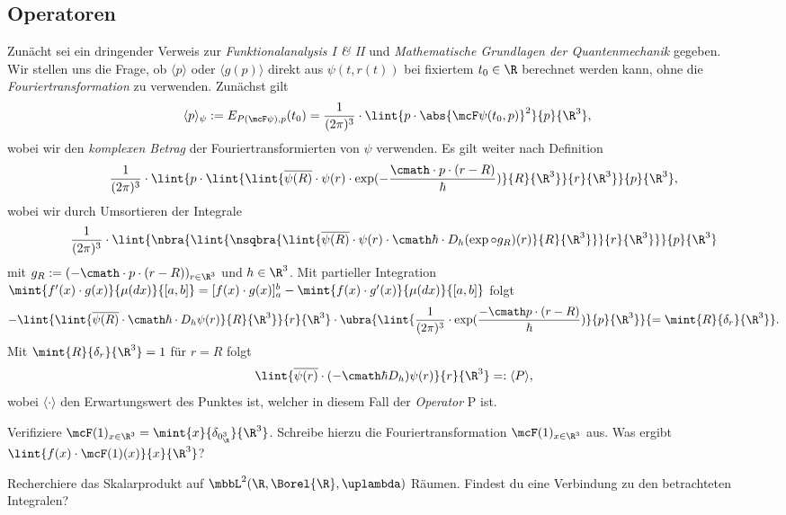 \documentclass{subfiles}
\begin{document}

    \subsection{Operatoren}
        Zunächt sei ein dringender Verweis zur \emph{Funktionalanalysis I & II} und \emph{Mathematische Grundlagen der Quantenmechanik} gegeben. \\

        Wir stellen uns die Frage, ob $\langle p\rangle$ oder $\langle g(p)\rangle$ direkt aus $\psi(t,r(t))$ bei fixiertem $t_0\in\R$ berechnet werden kann, ohne die \emph{Fouriertransformation} zu verwenden. Zunächst gilt 
        \begin{align*}
            \langle p\rangle_\psi:= E_{P(\mcF\psi),p}(t_0) &= \frac{1}{(2\pi)^3}\cdot\lint{p\cdot\abs{\mcF\psi(t_0,p)}^2}{p}{\R^3}, 
        \end{align*}
        wobei wir den \emph{komplexen Betrag} der Fouriertransformierten von $\psi$ verwenden. Es gilt weiter nach Definition
        \[\frac{1}{(2\pi)^3}\cdot\lint{p\cdot\lint{\lint{\overline{\psi(R)}\cdot\psi(r)\cdot\exp(-\frac{\cmath\cdot p\cdot (r-R)}{\hbar})}{R}{\R^3}}{r}{\R^3}}{p}{\R^3},\]
        wobei wir durch Umsortieren der Integrale 
        \[\frac{1}{(2\pi)^3}\cdot\lint{\nbra{\lint{\nsqbra{\lint{\overline{\psi(R)}\cdot\psi(r)\cdot \cmath\hbar\cdot D_h(\exp\circ g_R)(r)}{R}{\R^3}}}{r}{\R^3}}}{p}{\R^3}\]
        mit $g_R:=(-\cmath\cdot p\cdot(r-R))_{r\in\R^3}$ und $h\in\R^3$. Mit partieller Integration $\mint{f'(x)\cdot g(x)}{\mu(dx)}{[a,b]} = [f(x)\cdot g(x)]_a^b-\mint{f(x)\cdot g'(x)}{\mu(dx)}{[a,b]}$ folgt
        \[-\lint{\lint{\overline{\psi(R)}\cdot\cmath\hbar\cdot D_h\psi(r)}{R}{\R^3}}{r}{\R^3}\cdot\ubra{\lint{\frac{1}{(2\pi)^3}\cdot\exp(\frac{-\cmath p\cdot(r-R)}{\hbar})}{p}{\R^3}}{=\mint{R}{\delta_r}{\R^3}}.\]
        Mit $\mint{R}{\delta_r}{\R^3} = 1$ für $r=R$ folgt 
        \[\lint{\overline{\psi(r)}\cdot(-\cmath\hbar D_h)\psi(r)}{r}{\R^3} =: \langle P\rangle,\]
        wobei $\langle \cdot\rangle$ den Erwartungswert des Punktes ist, welcher in diesem Fall der \emph{Operator} P ist. 

        \begin{Aufgabe}
            \nr{} Verifiziere $\mcF(1)_{x\in\R^3} = \mint{x}{\delta_{0_\R^3}}{\R^3}$. Schreibe hierzu die Fouriertransformation $\mcF(1)_{x\in\R^3}$ aus. Was ergibt $\lint{f(x)\cdot\mcF(1)(x)}{x}{\R^3}$? 

            \nr{} Recherchiere das Skalarprodukt auf $\mbbL^2(\R,\Borel{\R},\uplambda)$ Räumen. Findest du eine Verbindung zu den betrachteten Integralen?
        \end{Aufgabe}
\end{document}
